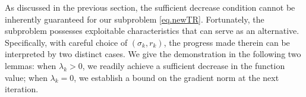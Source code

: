 \documentclass{article}
\begin{document}
\begin{algorithm}[!ht]
    \caption{Local Detection for ATR (LD)}\label{alg.local detection}
    \begin{algorithmic}[1]
        \ENDFOR
        \ENDIF
        \ENDIF
        \ELSE
        \ENDIF
        \STATE{$\mu_-=\mu$}
        \STATE{$\mu_+ = \mu$}
        \ELSE
        \ENDIF
        \ENDWHILE
    \end{algorithmic}
\end{algorithm}

As discussed in the previous section, the sufficient decrease condition cannot be inherently guaranteed for our subproblem \eqref{eq.newTR}. Fortunately, the subproblem possesses exploitable characteristics that can serve as an alternative. Specifically, with careful choice of $(\sigma_k,r_k)$, the progress made therein can be interpreted by two distinct cases. We give the demonstration in the following two lemmas: when $\lambda_k>0$, we readily achieve a sufficient decrease in the function value; when $\lambda_k = 0$, we establish a bound on the gradient norm at the next iteration.
\end{document}
